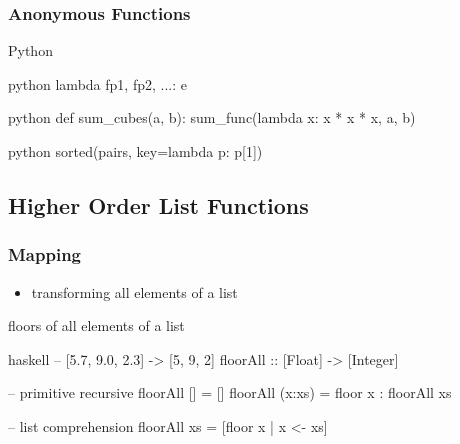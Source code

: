 \documentclass[dvipsnames]{beamer}
\theoremstyle{plain}
\begin{document}
\begin{frame}[fragile]
  \frametitle{Anonymous Functions}

  \begin{block}{Python}
    \begin{pygments}{python}
      lambda fp1, fp2, ...: e
    \end{pygments}
  \end{block}

  \medskip
  \begin{example}{}
    \begin{pygments}{python}
def sum_cubes(a, b):
    sum_func(lambda x: x * x * x, a, b)
    \end{pygments}

    \pause
    \bigskip
    \begin{pygments}{python}
sorted(pairs, key=lambda p: p[1])
    \end{pygments}
  \end{example}
\end{frame}

\subsection{Higher Order List Functions}

\begin{frame}[fragile]
  \frametitle{Mapping}

  \begin{itemize}
    \item transforming all elements of a list
  \end{itemize}

  \begin{exampleblock}{floors of all elements of a list}
    \begin{pygments}{haskell}
-- [5.7, 9.0, 2.3] -> [5, 9, 2]
floorAll :: [Float] -> [Integer]

-- primitive recursive
floorAll []     = []
floorAll (x:xs) = floor x : floorAll xs

-- list comprehension
floorAll xs = [floor x | x <- xs]
    \end{pygments}
  \end{exampleblock}
\end{frame}
\end{document}
